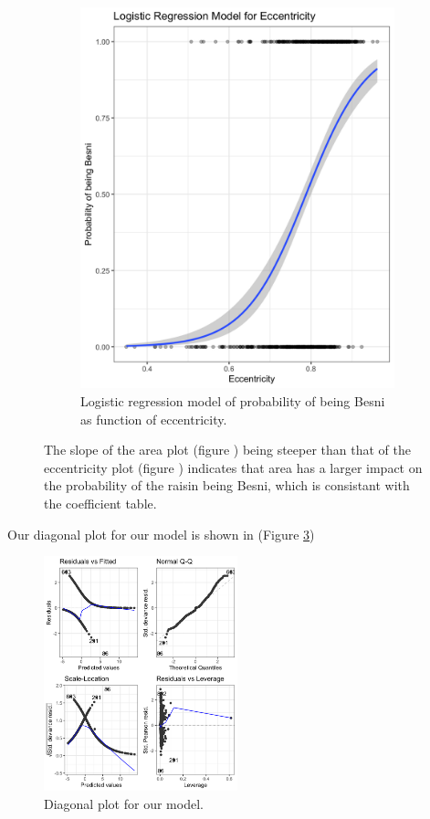 \documentclass{article}
\begin{document}
\begin{figure}[ht]
\begin{subfigure}{0.4\textwidth}
		\includegraphics[width=\textwidth]{ecc_plot}
		\caption{Logistic regression model of probability of being Besni as function of eccentricity.}
		\label{fig:ecc}
	\end{subfigure}
	\caption{The slope of the area plot (figure ) being steeper than that of the eccentricity plot (figure ) indicates that area has a larger impact on the probability of the raisin being Besni, which is consistant with the coefficient table.}
	\label{fig:lr}
\end{figure}
Our diagonal plot for our model is shown in (Figure \ref{fig:diag})
\begin{figure}[!ht]
	\centering
	\includegraphics[width=0.5\textwidth]{diagonal_plots}
\caption{Diagonal plot for our model.}
\label{fig:diag}
\end{figure}
\end{document}
